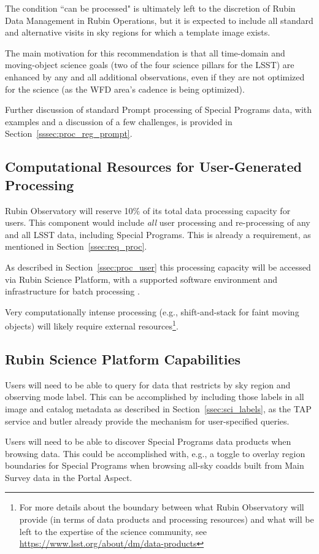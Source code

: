 The condition ``can be processed" is ultimately left to the discretion of
Rubin Data Management in Rubin Operations, but it is expected to include
all standard and alternative visits in sky regions for which a template image exists.

The main motivation for this recommendation is that all time-domain and 
moving-object science goals (two of the four science pillars for the LSST) are
enhanced by any and all additional observations, even if they are not
optimized for the science (as the WFD area's cadence is being optimized).

Further discussion of standard Prompt processing of Special Programs data, with
examples and a discussion of a few challenges,
is provided in Section~\ref{sssec:proc_reg_prompt}.

\subsection{Computational Resources for User-Generated Processing}\label{ssec:sci_comp}

Rubin Observatory will reserve 10\% of its total data processing capacity for users.
This component would include {\it all} user processing and re-processing of any and 
all LSST data, including Special Programs. 
This is already a requirement, as mentioned in Section~\ref{ssec:req_proc}.

As described in Section~\ref{ssec:proc_user} this processing capacity will be 
accessed via Rubin Science Platform, with a supported software environment and 
infrastructure for batch processing .

Very computationally intense processing (e.g., shift-and-stack for faint moving 
objects) will likely require external resources\footnote{For more details about 
the boundary between what Rubin Observatory will provide (in terms of data products 
and processing resources) and what will be left to the expertise of the science community, 
see \url{https://www.lsst.org/about/dm/data-products}}.

\subsection{Rubin Science Platform Capabilities}\label{ssec:sci_rsp}

Users will need to be able to query for data that restricts by sky region and 
observing mode label. 
This can be accomplished by including those labels in all image and catalog 
metadata as described in Section~\ref{ssec:sci_labels}, as the TAP service 
and butler already provide the mechanism for user-specified queries.

Users will need to be able to discover Special Programs data products when 
browsing data.
This could be accomplished with, e.g., a toggle to overlay region boundaries
for Special Programs when browsing all-sky coadds built from Main Survey data
in the Portal Aspect.


